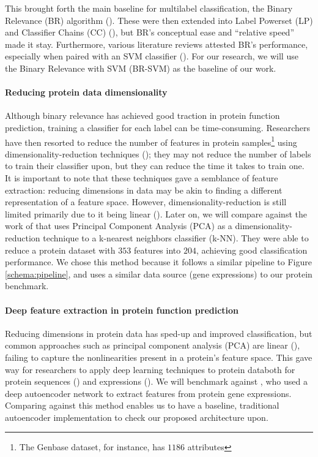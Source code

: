 \par This brought forth the main baseline for multilabel classification, the
Binary Relevance (BR) algorithm
(\cite{godbole2004discriminative,tsoumakas2007multilabel}). These were then
extended into Label Powerset (LP) and Classifier Chains (CC)
(\cite{read2009classifier}), but BR's conceptual ease and ``relative speed''
made it stay. Furthermore, various literature reviews attested BR's
performance, especially when paired with an SVM classifier
(\cite{luaces2012binary, zhang2014review,tsoumakas2017data}). For our
research, we will use the Binary Relevance with SVM (BR-SVM) as the baseline
of our work.

\paragraph{Reducing protein data dimensionality} Although binary relevance
has achieved good traction in protein function prediction, training a
classifier for each label can be time-consuming. Researchers have then
resorted to reduce the number of features in protein samples\footnote{The Genbase
dataset, for instance, has $1186$ attributes} using dimensionality-reduction
techniques (\cite{wang2009using, wang2013protein, wang2017protein}); they may
not reduce the number of labels to train their classifier upon, but they can
reduce the time it takes to train one. It is important to note that these
techniques gave a semblance of feature extraction: reducing dimensions in
data may be akin to finding a different representation of a feature space.
However, dimensionality-reduction is still limited primarily due to it being
linear (\cite{cunningham2015linear}). Later on, we will
compare against the work of \cite{wang2013protein} that uses Principal
Component Analysis (PCA) as a dimensionality-reduction technique to a
k-nearest neighbors classifier (k-NN). They were able to reduce a protein
dataset with $353$ features into $204$, achieving good classification
performance. We chose this method because it follows a similar pipeline to
Figure \ref{schema:pipeline}, and uses a similar data source (gene
expressions) to our protein benchmark.

\paragraph{Deep feature extraction in protein function prediction}
Reducing dimensions in protein data has sped-up and improved classification,
but common approaches such as principal component analysis (PCA) are linear
(\cite{bengio2013representation}), failing to capture the nonlinearities
present in a protein's feature space. This gave way for researchers to apply
deep learning techniques to protein data\textemdash both for protein
sequences (\cite{bhola2014machine,kulmanov2017deepgo, zou2017protein}) and
expressions (\cite{baldi2001bioinformatics, chicco2014deep}). We
will benchmark against \cite{chicco2014deep}, who used a deep autoencoder
network to extract features from protein gene expressions. Comparing against
this method enables us to have a baseline, traditional autoencoder
implementation to check our proposed architecture upon.

